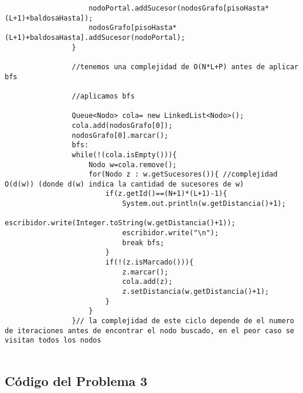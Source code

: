 \documentclass[a4paper]{article}
\begin{document}
\begin{lstlisting}
					nodoPortal.addSucesor(nodosGrafo[pisoHasta*(L+1)+baldosaHasta]);
					nodosGrafo[pisoHasta*(L+1)+baldosaHasta].addSucesor(nodoPortal);
				}
				
				//tenemos una complejidad de O(N*L+P) antes de aplicar bfs
				
				//aplicamos bfs
				
				Queue<Nodo> cola= new LinkedList<Nodo>();
				cola.add(nodosGrafo[0]);
				nodosGrafo[0].marcar();
				bfs:
				while(!(cola.isEmpty())){
					Nodo w=cola.remove();
					for(Nodo z : w.getSucesores()){ //complejidad O(d(w)) (donde d(w) indica la cantidad de sucesores de w)
						if(z.getId()==(N+1)*(L+1)-1){
							System.out.println(w.getDistancia()+1);
							escribidor.write(Integer.toString(w.getDistancia()+1));						
							escribidor.write("\n");
							break bfs;
						}	
						if(!(z.isMarcado())){
							z.marcar();
							cola.add(z);
							z.setDistancia(w.getDistancia()+1);
						}
					}
				}// la complejidad de este ciclo depende de el numero de iteraciones antes de encontrar el nodo buscado, en el peor caso se visitan todos los nodos


\end{lstlisting}

\subsection{Código del Problema 3}
\end{document}
